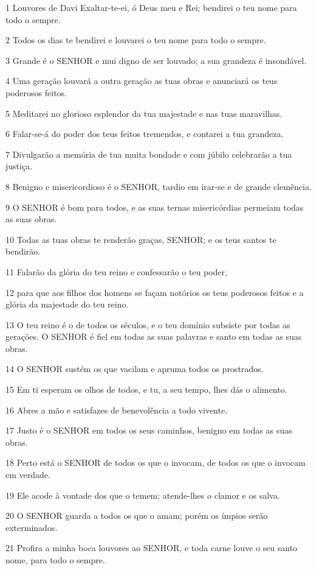 \par 1 Louvores de Davi Exaltar-te-ei, ó Deus meu e Rei; bendirei o teu nome para todo o sempre.
\par 2 Todos os dias te bendirei e louvarei o teu nome para todo o sempre.
\par 3 Grande é o SENHOR e mui digno de ser louvado; a sua grandeza é insondável.
\par 4 Uma geração louvará a outra geração as tuas obras e anunciará os teus poderosos feitos.
\par 5 Meditarei no glorioso esplendor da tua majestade e nas tuas maravilhas.
\par 6 Falar-se-á do poder dos teus feitos tremendos, e contarei a tua grandeza.
\par 7 Divulgarão a memória de tua muita bondade e com júbilo celebrarão a tua justiça.
\par 8 Benigno e misericordioso é o SENHOR, tardio em irar-se e de grande clemência.
\par 9 O SENHOR é bom para todos, e as suas ternas misericórdias permeiam todas as suas obras.
\par 10 Todas as tuas obras te renderão graças, SENHOR; e os teus santos te bendirão.
\par 11 Falarão da glória do teu reino e confessarão o teu poder,
\par 12 para que aos filhos dos homens se façam notórios os teus poderosos feitos e a glória da majestade do teu reino.
\par 13 O teu reino é o de todos os séculos, e o teu domínio subsiste por todas as gerações. O SENHOR é fiel em todas as suas palavras e santo em todas as suas obras.
\par 14 O SENHOR sustém os que vacilam e apruma todos os prostrados.
\par 15 Em ti esperam os olhos de todos, e tu, a seu tempo, lhes dás o alimento.
\par 16 Abres a mão e satisfazes de benevolência a todo vivente.
\par 17 Justo é o SENHOR em todos os seus caminhos, benigno em todas as suas obras.
\par 18 Perto está o SENHOR de todos os que o invocam, de todos os que o invocam em verdade.
\par 19 Ele acode à vontade dos que o temem; atende-lhes o clamor e os salva.
\par 20 O SENHOR guarda a todos os que o amam; porém os ímpios serão exterminados.
\par 21 Profira a minha boca louvores ao SENHOR, e toda carne louve o seu santo nome, para todo o sempre.


